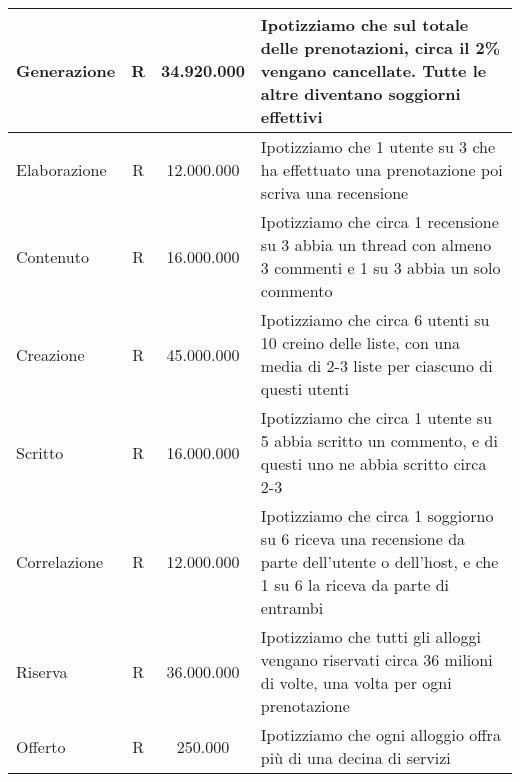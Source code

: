 \begin{longtable}{|l|c|c|p{6.2cm}|}
    Generazione              & R             & 34.920.000      & {Ipotizziamo che sul totale delle prenotazioni, circa il 2\% vengano cancellate. Tutte le altre diventano soggiorni effettivi}               \\\hline
    Elaborazione             & R             & 12.000.000      & {Ipotizziamo che 1 utente su 3 che ha effettuato una prenotazione poi scriva una recensione}                                                 \\\hline
    Contenuto                & R             & 16.000.000      & {Ipotizziamo che circa 1 recensione su 3 abbia un thread con almeno 3 commenti e 1 su 3 abbia un solo commento}                              \\\hline
    Creazione                & R             & 45.000.000      & {Ipotizziamo che circa 6 utenti su 10 creino delle liste, con una media di 2-3 liste per ciascuno di questi utenti}                          \\\hline
    Scritto                  & R             & 16.000.000      & {Ipotizziamo che circa 1 utente su 5 abbia scritto un commento, e di questi uno ne abbia scritto circa 2-3}                                  \\\hline
    Correlazione             & R             & 12.000.000      & {Ipotizziamo che circa 1 soggiorno su 6 riceva una recensione da parte dell'utente o dell'host, e che 1 su 6 la riceva da parte di entrambi} \\\hline
    Riserva                  & R             & 36.000.000      & {Ipotizziamo che tutti gli alloggi vengano riservati circa 36 milioni di volte, una volta per ogni prenotazione}                             \\\hline
    Offerto                  & R             & 250.000         & {Ipotizziamo che ogni alloggio offra più di una decina di servizi}                                                                           \\\hline
\end{longtable}
\normalsize